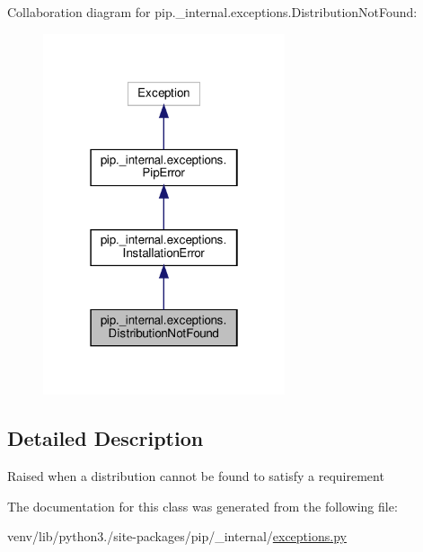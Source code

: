 Collaboration diagram for pip.\+\_\+internal.\+exceptions.\+Distribution\+Not\+Found\+:
\nopagebreak
\begin{figure}[H]
\begin{center}
\leavevmode
\includegraphics[width=202pt]{classpip_1_1__internal_1_1exceptions_1_1DistributionNotFound__coll__graph}
\end{center}
\end{figure}


\subsection{Detailed Description}
\begin{DoxyVerb}Raised when a distribution cannot be found to satisfy a requirement\end{DoxyVerb}
 

The documentation for this class was generated from the following file\+:\begin{DoxyCompactItemize}
\item 
venv/lib/python3./site-\/packages/pip/\+\_\+internal/\hyperlink{pip_2__internal_2exceptions_8py}{exceptions.\+py}\end{DoxyCompactItemize}
